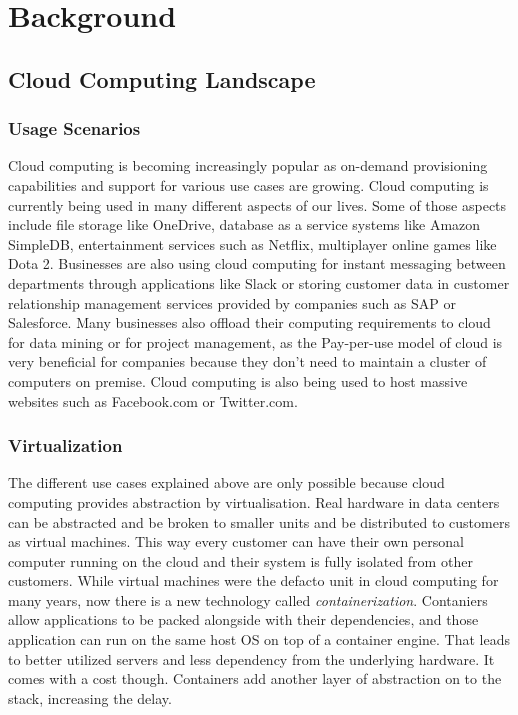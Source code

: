 
\chapter{Background}\label{chapter:background} %

\section{Cloud Computing Landscape} %
\subsection{Usage Scenarios}
Cloud computing is becoming increasingly popular as on-demand provisioning capabilities and support for various use cases are growing. Cloud computing is currently being used in many different aspects of our lives. \cite{cloud-use-cases} Some of those aspects include file storage like OneDrive, database as a service systems like Amazon SimpleDB, entertainment services such as Netflix, multiplayer online games like Dota 2. Businesses are also using cloud computing for instant messaging between departments through applications like Slack or storing customer data in customer relationship management services provided by companies such as SAP or Salesforce. Many businesses also offload their computing requirements to cloud for data mining or for project management, as the Pay-per-use model of cloud is very beneficial for companies because they don't need to maintain a cluster of computers on premise. Cloud computing is also being used to host massive websites such as Facebook.com or Twitter.com.
\subsection{Virtualization}
The different use cases explained above are only possible because cloud computing provides abstraction by virtualisation. Real hardware in data centers can be abstracted and be broken to smaller units and be distributed to customers as virtual machines. This way every customer can have their own personal computer running on the cloud and their system is fully isolated from other customers. While virtual machines were the defacto unit in cloud computing for many years, now there is a new technology called \textit{containerization}. Contaniers allow applications to be packed alongside with their dependencies, and those application can run on the same host OS on top of a container engine. That leads to better utilized servers and less dependency from the underlying hardware. It comes with a cost though. Containers add another layer of abstraction on to the stack, increasing the delay. 

